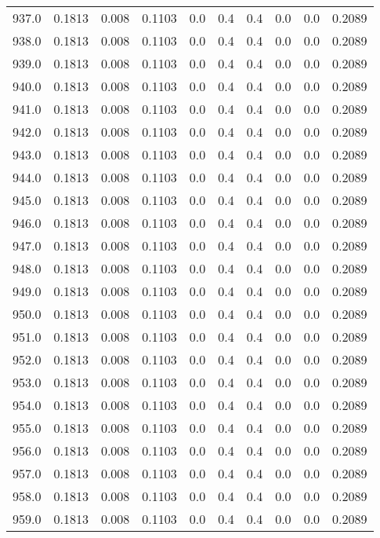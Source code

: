 \begin{longtable}{lrrrrrrrrr}
937.0 & 0.1813 & 0.008 & 0.1103 & 0.0 & 0.4 & 0.4 & 0.0 & 0.0 & 0.2089 \\
938.0 & 0.1813 & 0.008 & 0.1103 & 0.0 & 0.4 & 0.4 & 0.0 & 0.0 & 0.2089 \\
939.0 & 0.1813 & 0.008 & 0.1103 & 0.0 & 0.4 & 0.4 & 0.0 & 0.0 & 0.2089 \\
940.0 & 0.1813 & 0.008 & 0.1103 & 0.0 & 0.4 & 0.4 & 0.0 & 0.0 & 0.2089 \\
941.0 & 0.1813 & 0.008 & 0.1103 & 0.0 & 0.4 & 0.4 & 0.0 & 0.0 & 0.2089 \\
942.0 & 0.1813 & 0.008 & 0.1103 & 0.0 & 0.4 & 0.4 & 0.0 & 0.0 & 0.2089 \\
943.0 & 0.1813 & 0.008 & 0.1103 & 0.0 & 0.4 & 0.4 & 0.0 & 0.0 & 0.2089 \\
944.0 & 0.1813 & 0.008 & 0.1103 & 0.0 & 0.4 & 0.4 & 0.0 & 0.0 & 0.2089 \\
945.0 & 0.1813 & 0.008 & 0.1103 & 0.0 & 0.4 & 0.4 & 0.0 & 0.0 & 0.2089 \\
946.0 & 0.1813 & 0.008 & 0.1103 & 0.0 & 0.4 & 0.4 & 0.0 & 0.0 & 0.2089 \\
947.0 & 0.1813 & 0.008 & 0.1103 & 0.0 & 0.4 & 0.4 & 0.0 & 0.0 & 0.2089 \\
948.0 & 0.1813 & 0.008 & 0.1103 & 0.0 & 0.4 & 0.4 & 0.0 & 0.0 & 0.2089 \\
949.0 & 0.1813 & 0.008 & 0.1103 & 0.0 & 0.4 & 0.4 & 0.0 & 0.0 & 0.2089 \\
950.0 & 0.1813 & 0.008 & 0.1103 & 0.0 & 0.4 & 0.4 & 0.0 & 0.0 & 0.2089 \\
951.0 & 0.1813 & 0.008 & 0.1103 & 0.0 & 0.4 & 0.4 & 0.0 & 0.0 & 0.2089 \\
952.0 & 0.1813 & 0.008 & 0.1103 & 0.0 & 0.4 & 0.4 & 0.0 & 0.0 & 0.2089 \\
953.0 & 0.1813 & 0.008 & 0.1103 & 0.0 & 0.4 & 0.4 & 0.0 & 0.0 & 0.2089 \\
954.0 & 0.1813 & 0.008 & 0.1103 & 0.0 & 0.4 & 0.4 & 0.0 & 0.0 & 0.2089 \\
955.0 & 0.1813 & 0.008 & 0.1103 & 0.0 & 0.4 & 0.4 & 0.0 & 0.0 & 0.2089 \\
956.0 & 0.1813 & 0.008 & 0.1103 & 0.0 & 0.4 & 0.4 & 0.0 & 0.0 & 0.2089 \\
957.0 & 0.1813 & 0.008 & 0.1103 & 0.0 & 0.4 & 0.4 & 0.0 & 0.0 & 0.2089 \\
958.0 & 0.1813 & 0.008 & 0.1103 & 0.0 & 0.4 & 0.4 & 0.0 & 0.0 & 0.2089 \\
959.0 & 0.1813 & 0.008 & 0.1103 & 0.0 & 0.4 & 0.4 & 0.0 & 0.0 & 0.2089 \\

\end{longtable}
